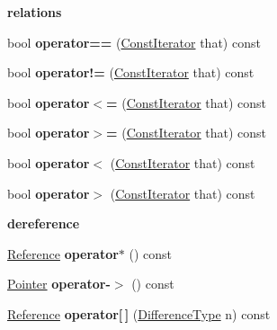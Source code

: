 \begin{Indent}{\bf relations}\par
\begin{DoxyCompactItemize}
\item 
bool {\bfseries operator==} (\hyperlink{a00118_ae5be27a73dce0be58ee2776db896d591}{Const\+Iterator} that) const \hypertarget{a00118_aacbaf8c5dfded8148a5ecd400338d457}{}\label{a00118_aacbaf8c5dfded8148a5ecd400338d457}

\item 
bool {\bfseries operator!=} (\hyperlink{a00118_ae5be27a73dce0be58ee2776db896d591}{Const\+Iterator} that) const \hypertarget{a00118_a829ba40cafa98fd5ced56a07658ce0b7}{}\label{a00118_a829ba40cafa98fd5ced56a07658ce0b7}

\item 
bool {\bfseries operator$<$=} (\hyperlink{a00118_ae5be27a73dce0be58ee2776db896d591}{Const\+Iterator} that) const \hypertarget{a00118_a395f81480589f78cb2497509730e36c3}{}\label{a00118_a395f81480589f78cb2497509730e36c3}

\item 
bool {\bfseries operator$>$=} (\hyperlink{a00118_ae5be27a73dce0be58ee2776db896d591}{Const\+Iterator} that) const \hypertarget{a00118_afe815c6a0cd2f72f800b59fdb443d223}{}\label{a00118_afe815c6a0cd2f72f800b59fdb443d223}

\item 
bool {\bfseries operator$<$} (\hyperlink{a00118_ae5be27a73dce0be58ee2776db896d591}{Const\+Iterator} that) const \hypertarget{a00118_a6a897b2e89822d798c985008fc3a9a18}{}\label{a00118_a6a897b2e89822d798c985008fc3a9a18}

\item 
bool {\bfseries operator$>$} (\hyperlink{a00118_ae5be27a73dce0be58ee2776db896d591}{Const\+Iterator} that) const \hypertarget{a00118_a89c57197cd49cfa6cf98e3bdf1454640}{}\label{a00118_a89c57197cd49cfa6cf98e3bdf1454640}

\end{DoxyCompactItemize}
\end{Indent}
\begin{Indent}{\bf dereference}\par
\begin{DoxyCompactItemize}
\item 
\hyperlink{a00118_ae80f6b601eb9e24f73aa75fb32b35c65}{Reference} {\bfseries operator$\ast$} () const \hypertarget{a00118_a37f5cb3b669682da70fe3e5ec6bc4775}{}\label{a00118_a37f5cb3b669682da70fe3e5ec6bc4775}

\item 
\hyperlink{a00118_ac69f141f1fde31c1f550f524a69c5de9}{Pointer} {\bfseries operator-\/$>$} () const \hypertarget{a00118_a2e3d0e0f9a5c0ca69f09e4927ed985c3}{}\label{a00118_a2e3d0e0f9a5c0ca69f09e4927ed985c3}

\item 
\hyperlink{a00118_ae80f6b601eb9e24f73aa75fb32b35c65}{Reference} {\bfseries operator\mbox{[}$\,$\mbox{]}} (\hyperlink{a00118_a902b99c8ae351cd7626514dc5f30740a}{Difference\+Type} n) const \hypertarget{a00118_ae83095869e033554257e3f33df59fcfb}{}\label{a00118_ae83095869e033554257e3f33df59fcfb}

\end{DoxyCompactItemize}
\end{Indent}
